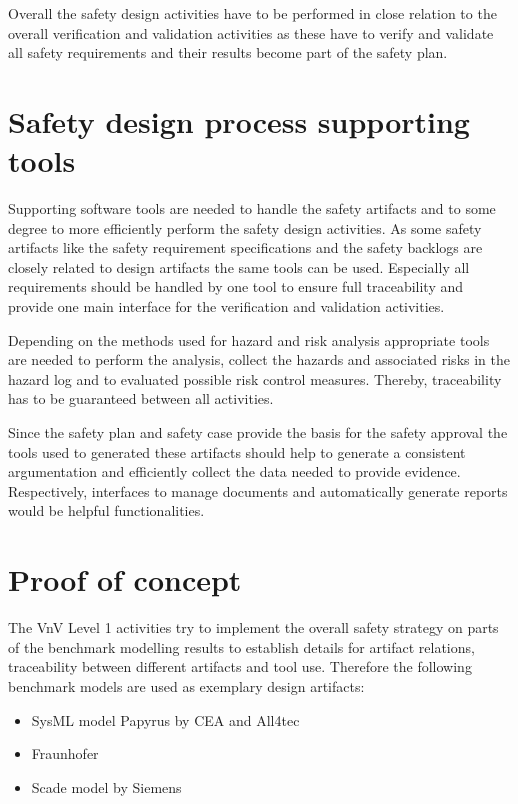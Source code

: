 \documentclass{template/openetcs_report}
\begin{document}
Overall the safety design activities have to be performed in close relation to the overall verification and validation activities as these have to verify and validate all safety requirements and their results become part of the safety plan.


\section{Safety design process supporting tools}

Supporting software tools are needed to handle the safety artifacts and to some degree to more efficiently perform the safety design activities. As some safety artifacts like the safety requirement specifications and the safety backlogs are closely related to design artifacts the same tools can be used. Especially all requirements should be handled by one tool to ensure full traceability and provide one main interface for the verification and validation activities.

Depending on the methods used for hazard and risk analysis appropriate tools are needed to perform the analysis, collect the hazards and associated risks in the hazard log and to evaluated possible risk control measures. Thereby, traceability has to be guaranteed between all activities.

Since the safety plan and safety case provide the basis for the safety approval the tools used to generated these artifacts should help to generate a consistent argumentation and efficiently collect the data needed to provide evidence. Respectively, interfaces to manage documents and automatically generate reports would be helpful functionalities.


\section{Proof of concept}
\label{sec:Proofofconcept}

The VnV Level 1 activities try to implement the overall safety strategy on parts of the benchmark modelling results to establish details for artifact relations, traceability between different artifacts and tool use. Therefore the following benchmark models are used as exemplary design artifacts:

\begin{itemize}
\item SysML model Papyrus by CEA and All4tec

\item Fraunhofer

\item Scade model by Siemens
\end{itemize}
\end{document}

